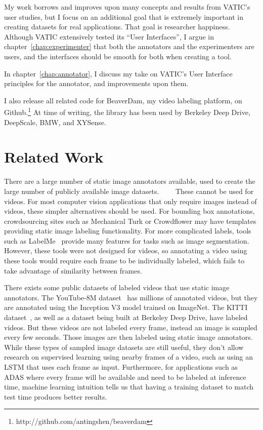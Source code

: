My work borrows and improves upon many concepts and results from VATIC's user studies, but I focus on an additional goal that is extremely important in creating datasets for real applications. That goal is researcher happiness.
Although VATIC extensively tested its ``User Interfaces'', I argue in chapter~\ref{chap:experimenter} that both the annotators and the experimenters are users, and the interfaces should be smooth for both when creating a tool.

In chapter~\ref{chap:annotator}, I discuss my take on VATIC's User Interface principles for the annotator, and improvements upon them.

I also release all related code for BeaverDam, my video labeling platform, on Github.\footnote{http://github.com/antingshen/beaverdam} At time of writing, the library has been used by Berkeley Deep Drive, DeepScale, BMW, and XYSense.

\section*{Related Work}
\label{sec:related}

There are a large number of static image annotators available, used to create the large number of publicly available image datasets.~\cite{IG02}~\cite{LabelMe}~\cite{ImageNet}~\cite{Pascal}
These cannot be used for videos.
For most computer vision applications that only require images instead of videos, these simpler alternatives should be used.
For bounding box annotations, crowdsourcing sites such as Mechanical Turk or Crowdflower may have templates providing static image labeling functionality.
For more complicated labels, tools such as LabelMe~\cite{LabelMe} provide many features for tasks such as image segmentation.
However, these tools were not designed for videos, so annotating a video using these tools would require each frame to be individually labeled, which fails to take advantage of similarity between frames.

There exists some public datasets of labeled videos that use static image annotators.
The YouTube-8M dataset~\cite{YouTube-8M} has millions of annotated videos, but they are annotated using the Inception V3 model trained on ImageNet.
The KITTI dataset~\cite{KITTI}, as well as a dataset being built at Berkeley Deep Drive, have labeled videos.
But these videos are not labeled every frame, instead an image is sampled every few seconds.
Those images are then labeled using static image annotators.
While these types of sampled image datasets are still useful, they don't allow research on supervised learning using nearby frames of a video, such as using an LSTM that uses each frame as input.
Furthermore, for applications such as ADAS where every frame will be available and need to be labeled at inference time, machine learning intuition tells us that having a training dataset to match test time produces better results.

